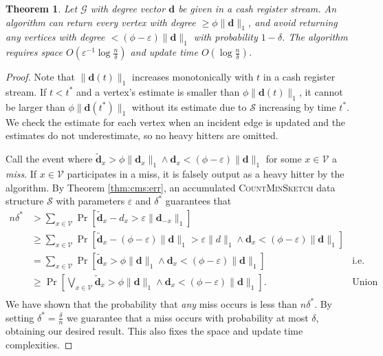 \documentclass{report}
\newtheorem{theorem}{Theorem}[section]
\newcommand{\algoname}[1]{\textnormal{\textsc{#1}}}
\begin{document}
\begin{theorem} \label{thm:dchh:cashregister}
Let $\mathcal{G}$ with degree vector $\mathbf{d}$ be given in a cash register stream.
An algorithm can return every vertex with degree $\geq \phi \|\mathbf{d}\|_1$, and avoid returning any vertices with degree $< (\phi - \varepsilon)\|\mathbf{d}\|_1$ with probability $1-\delta$.
The algorithm requires space $O \left ( \varepsilon^{-1}\log \frac{n}{\delta} \right )$ and update time $O \left ( \log \frac{n}{\delta} \right )$.
\end{theorem}

\begin{proof}
Note that $\|\mathbf{d}(t)\|_1$ increases monotonically with $t$ in a cash register stream. 
If $t < t^*$ and a vertex's estimate is smaller than $\phi \|\mathbf{d}(t)\|_1$, it cannot be larger than $\phi \|\mathbf{d}(t^*)\|_1$ without its estimate due to $\mathcal{S}$ increasing by time $t^*$.
We check the estimate for each vertex when an incident edge is updated and the estimates do not underestimate, so no heavy hitters are omitted.

Call the event where $\widetilde{\mathbf{d}}_x > \phi \|\mathbf{d}_{x}\|_1 \wedge \mathbf{d}_x < (\phi - \varepsilon) \|\mathbf{d}\|_1$ for some $x \in \mathcal{V}$ a \emph{miss}.
If $x \in \mathcal{V}$ participates in a miss, it is falsely output as a heavy hitter by the algorithm.
By Theorem \ref{thm:cms:err}, an accumulated \algoname{CountMinSketch} data structure $\mathcal{S}$ with parameters $\varepsilon$ and $\delta^*$ guarantees that 
%
\begin{align*}
n\delta^* 
&>
\sum_{x \in \mathcal{V}} \Pr \left [ \widetilde{\mathbf{d}}_x - d_x > \varepsilon \|\mathbf{d}_{-x}\|_1 \right ] 
& \\
&\geq
\sum_{x \in \mathcal{V}} \Pr \left [ \widetilde{\mathbf{d}}_x - (\phi - \varepsilon)\|\mathbf{d}\|_1 > \varepsilon \|d\|_1 \wedge \mathbf{d}_x < (\phi - \varepsilon) \|\mathbf{d}\|_1 \right ] 
& \\
&=
\sum_{x \in \mathcal{V}} \Pr \left [ \widetilde{\mathbf{d}}_x > \phi \|\mathbf{d}\|_1 \wedge \mathbf{d}_x < (\phi - \varepsilon) \|\mathbf{d}\|_1 \right ] 
& \text{i.e. sum of misses}  \\
&\geq
\Pr \left [ \bigvee_{x \in \mathcal{V}} \widetilde{\mathbf{d}}_x > \phi \|\mathbf{d}\|_1 \wedge \mathbf{d}_x < (\phi - \varepsilon) \|\mathbf{d}\|_1 \right ].
& \text{Union bound} \\
\end{align*}
We have shown that the probability that \emph{any} miss occurs is less than $n\delta^*$.
By setting $\delta^* = \frac{\delta}{n}$ we guarantee that a miss occurs with probability at most $\delta$, obtaining our desired result.
This also fixes the space and update time complexities.
\end{proof}
\end{document}
